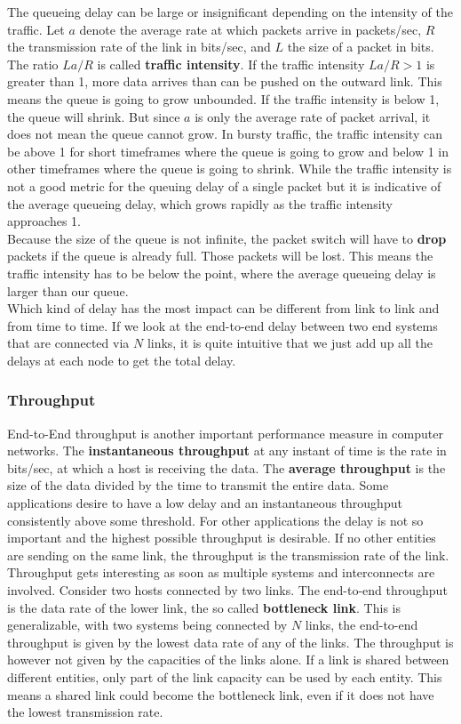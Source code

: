 The queueing delay can be large or insignificant depending on the intensity of the traffic. Let $a$ denote the average rate at which packets arrive in packets/sec, $R$ the transmission rate of the link in bits/sec, and $L$ the size of a packet in bits. The ratio $La/R$ is called \textbf{traffic intensity}. If the traffic intensity $La/R > 1$ is greater than 1, more data arrives than can be pushed on the outward link. This means the queue is going to grow unbounded. If the traffic intensity is below 1, the queue will shrink. But since $a$ is only the average rate of packet arrival, it does not mean the queue cannot grow. In bursty traffic, the traffic intensity can be above 1 for short timeframes where the queue is going to grow and below 1 in other timeframes where the queue is going to shrink. While the traffic intensity is not a good metric for the queuing delay of a single packet but it is indicative of the average queueing delay, which grows rapidly as the traffic intensity approaches 1. \\
Because the size of the queue is not infinite, the packet switch will have to \textbf{drop} packets if the queue is already full. Those packets will be lost. This means the traffic intensity has to be below the point, where the average queueing delay is larger than our queue.
\vspace{.4cm}\\
Which kind of delay has the most impact can be different from link to link and from time to time. If we look at the end-to-end delay between two end systems that are connected via $N$ links, it is quite intuitive that we just add up all the delays at each node to get the total delay.

\subsubsection{Throughput}
End-to-End throughput is another important performance measure in computer networks. The \textbf{instantaneous throughput} at any instant of time is the rate in bits/sec, at which a host is receiving the data. The \textbf{average throughput} is the size of the data divided by the time to transmit the entire data. Some applications desire to have a low delay and an instantaneous throughput consistently above some threshold. For other applications the delay is not so important and the highest possible throughput is desirable. If no other entities are sending on the same link, the throughput is the transmission rate of the link. \\
Throughput gets interesting as soon as multiple systems and interconnects are involved. Consider two hosts connected by two links. The end-to-end throughput is the data rate of the lower link, the so called \textbf{bottleneck link}. This is generalizable, with two systems being connected by $N$ links, the end-to-end throughput is given by the lowest data rate of any of the links. The throughput is however not given by the capacities of the links alone. If a link is shared between different entities, only part of the link capacity can be used by each entity. This means a shared link could become the bottleneck link, even if it does not have the lowest transmission rate.

